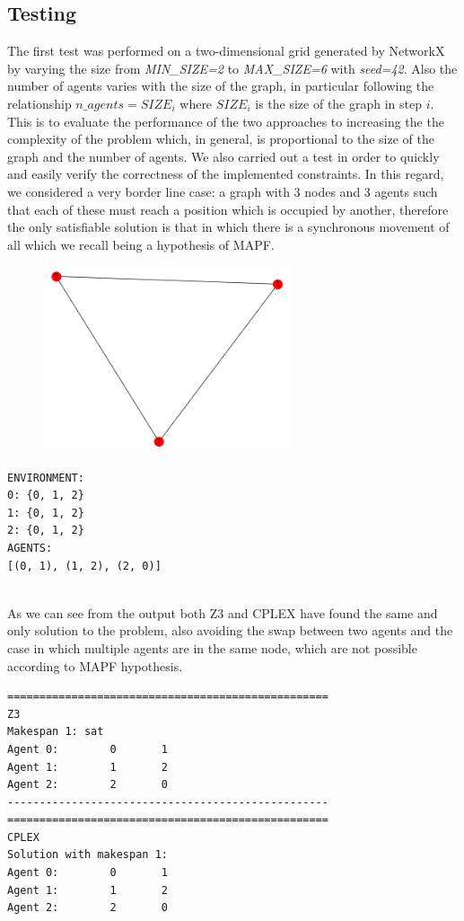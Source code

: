 \documentclass[12pt, a4paper, hidelinks]{article}
\numberwithin{equation}{section}
\begin{document}
\subsection{Testing}\label{subsec:testing}
The first test was performed on a two-dimensional grid generated by NetworkX by varying the size from \textit{MIN\_SIZE=2} to \textit{MAX\_SIZE=6} with \textit{seed=42}.
Also the number of agents varies with the size of the graph, in particular following the relationship $n\_agents = SIZE_i$ where $SIZE_i$ is the size of the graph in step $i$.
This is to evaluate the performance of the two approaches to increasing the the complexity of the problem which, in general, is proportional to the size of the graph and the number of agents.
We also carried out a test in order to quickly and easily verify the correctness of the implemented constraints.
In this regard, we considered a very border line case: a graph with 3 nodes and 3 agents such that each of these must reach a position
which is occupied by another, therefore the only satisfiable solution is that in which there is a synchronous movement of all which
we recall being a hypothesis of MAPF.
\begin{figure}
    \centering
    \includegraphics[width=0.65\textwidth]{synchronous_movement_graph.png}
\end{figure}
\begin{lstlisting}[label={lst:synchronized}]
ENVIRONMENT:
0: {0, 1, 2}
1: {0, 1, 2}
2: {0, 1, 2}
AGENTS:
[(0, 1), (1, 2), (2, 0)]
 
\end{lstlisting}
As we can see from the output both Z3 and CPLEX have found the same and only solution to the problem,
also avoiding the swap between two agents and the case in which multiple agents are in the same node,
which are not possible according to MAPF hypothesis.
\begin{lstlisting}[label={lst:test}]
==================================================
Z3
Makespan 1: sat
Agent 0:        0       1
Agent 1:        1       2
Agent 2:        2       0
--------------------------------------------------
==================================================
CPLEX
Solution with makespan 1:
Agent 0:        0       1
Agent 1:        1       2
Agent 2:        2       0
\end{lstlisting}
\end{document}

